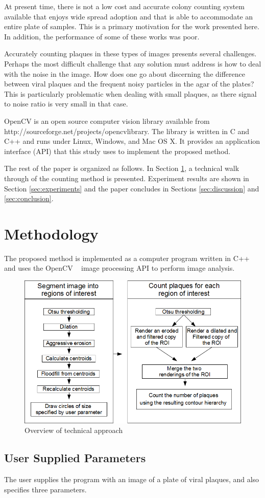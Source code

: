 \documentclass[11pt,final,twocolumn]{IEEEtran}
\begin{document}
At present time,  there is not a low cost and  accurate colony counting system available that enjoys wide spread adoption and that is able to accommodate an entire plate of samples. This is a primary motivation for the work presented here. In addition, the performance of some of these works was poor. 

Accurately counting plaques in these types of images presents several challenges. Perhaps the most difficult challenge that any solution must address is how to deal with the noise in the image.  How does one go about discerning the difference between viral plaques and the frequent noisy particles in the agar of the plates?  This is particularly problematic when dealing with small plaques, as there signal to noise ratio is very small in that case.  

OpenCV is an open source computer vision library available from http://sourceforge.net/projects/opencvlibrary. The library is written in C and C++ and runs under Linux, Windows, and Mac OS X. It provides an application interface (API) that this study uses to implement the proposed method. 


The rest of the paper is organized as follows. In Section \ref{sec:methodology}, a technical walk through of the counting method is presented. Experiment results are shown in Section \ref{sec:experiments} and the paper concludes in Sections \ref{sec:discussion} and \ref{sec:conclusion}.


\section{Methodology}\label{sec:methodology}
The proposed method is implemented as a computer program written in C++ and uses the  OpenCV ~\cite{openCV} image processing API to perform image analysis. 

\begin{figure}[H]
\centering
\includegraphics[width=.45\textwidth]{flowchart.png}
\caption{Overview of technical approach}
\label{fig:flowchart}
\end{figure}

\subsection{User Supplied Parameters}
The user supplies the program with an image of a plate of viral plaques, and also specifies three parameters.
\end{document}
